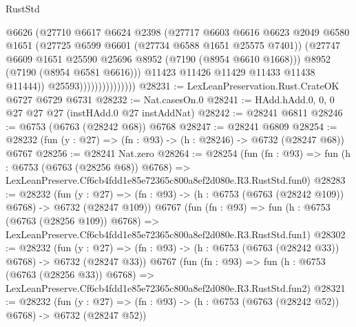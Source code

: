 \begin{lexlean}{RustStd}
\begin{coremodule}
                                    @6626
                                    (@27710
                                      @6617
                                      @6624
                                      @2398
                                      (@27717
                                        @6603
                                        @6616
                                        @6623
                                        @2049
                                        @6580
                                        @1651
                                        (@27725 @6599 @6601 (@27734 @6588 @1651 @25575 @7401))
                                        (@27747
                                          @6609
                                          @1651
                                          @25590
                                          @25696
                                          @8952
                                          (@7190 (@8954 @6610 @1668)))
                                        @8952
                                        (@7190 (@8954 @6581 @6616)))
                                      @11423
                                      @11426
                                      @11429
                                      @11433
                                      @11438
                                      @11444))
                                  @25593)))))))))))))))
@28231 := LexLeanPreservation.Rust.CrateOK @6727 @6729 @6731
@28232 := Nat.casesOn.{0}
@28241 := HAdd.hAdd.{0, 0, 0} @27 @27 @27 (instHAdd.{0} @27 instAddNat)
@28242 := @28241 @6811
@28246 := @6753 (@6763 (@28242 @68)) @6768
@28247 := @28241 @6809
@28254 := @28232 (fun (y : @27) => (fn : @93) -> (h : @28246) -> @6732 (@28247 @68)) @6767
@28256 := @28241 Nat.zero
@28264 := @28254
    (fun (fn : @93) =>
    fun (h : @6753 (@6763 (@28256 @68)) @6768) =>
    LexLeanPreserve.Cf6cb4fdd1e85e72365c800a8ef2d080e.R3.RustStd.fun0)
@28283 := @28232
    (fun (y : @27) => (fn : @93) -> (h : @6753 (@6763 (@28242 @109)) @6768) -> @6732 (@28247 @109))
    @6767
    (fun (fn : @93) =>
    fun (h : @6753 (@6763 (@28256 @109)) @6768) =>
    LexLeanPreserve.Cf6cb4fdd1e85e72365c800a8ef2d080e.R3.RustStd.fun1)
@28302 := @28232
    (fun (y : @27) => (fn : @93) -> (h : @6753 (@6763 (@28242 @33)) @6768) -> @6732 (@28247 @33))
    @6767
    (fun (fn : @93) =>
    fun (h : @6753 (@6763 (@28256 @33)) @6768) =>
    LexLeanPreserve.Cf6cb4fdd1e85e72365c800a8ef2d080e.R3.RustStd.fun2)
@28321 := @28232
    (fun (y : @27) => (fn : @93) -> (h : @6753 (@6763 (@28242 @52)) @6768) -> @6732 (@28247 @52))

\end{coremodule}
\end{lexlean}
